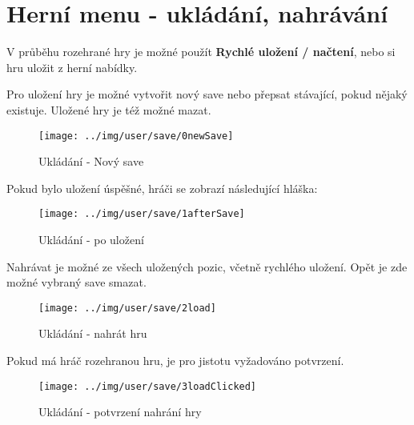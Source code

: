 
\section{Herní menu - ukládání, nahrávání}

V průběhu rozehrané hry je možné použít \textbf{Rychlé uložení / načtení}, nebo si hru uložit z herní nabídky.

Pro uložení hry je možné vytvořit nový save nebo přepsat stávající, pokud nějaký existuje. Uložené hry je též možné mazat.

\begin{figure}[!h]\centering
\texttt{[image: ../img/user/save/0newSave]}

\caption{Ukládání - Nový save}
\label{fig:user_save_0newSave}

\end{figure}
\FloatBarrier

Pokud bylo uložení úspěšné, hráči se zobrazí následující hláška:

\begin{figure}[!h]\centering
\texttt{[image: ../img/user/save/1afterSave]}

\caption{Ukládání - po uložení}
\label{fig:user_save_1afterSave}

\end{figure}
\FloatBarrier

Nahrávat je možné ze všech uložených pozic, včetně rychlého uložení. Opět je zde možné vybraný save smazat.

\begin{figure}[!h]\centering
\texttt{[image: ../img/user/save/2load]}

\caption{Ukládání - nahrát hru}
\label{fig:user_save_2load}

\end{figure}
\FloatBarrier

Pokud má hráč rozehranou hru, je pro jistotu vyžadováno potvrzení.

\begin{figure}[!h]\centering
\texttt{[image: ../img/user/save/3loadClicked]}

\caption{Ukládání - potvrzení nahrání hry}
\label{fig:user_save_3loadClicked}

\end{figure}

\FloatBarrier